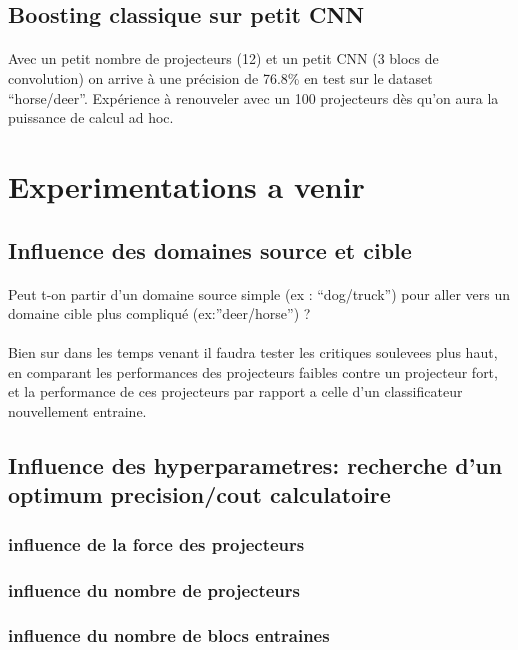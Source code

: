 \documentclass[11 pt]{article}
\begin{document}
\subsection{Boosting classique sur petit CNN}
\paragraph{}Avec un petit nombre de projecteurs (12) et un petit CNN (3 blocs de convolution) on arrive à une précision de 76.8\% en test sur le dataset “horse/deer”. Expérience à renouveler avec un 100 projecteurs dès qu’on aura la puissance de calcul ad hoc.

\section{Experimentations a venir}
\subsection{Influence des domaines source et cible}
\paragraph{}Peut t-on partir d’un domaine source simple (ex : “dog/truck”) pour aller vers un domaine cible plus compliqué (ex:”deer/horse”) ?

\paragraph{}Bien sur dans les temps venant il faudra tester les critiques soulevees plus haut, en comparant les performances des projecteurs faibles contre un projecteur fort, et la performance de ces projecteurs par rapport a celle d'un classificateur nouvellement entraine.


\subsection{Influence des hyperparametres: recherche d'un optimum precision/cout calculatoire}
\subsubsection{influence de la force des projecteurs}
\subsubsection{influence du nombre de projecteurs}
\subsubsection{influence du nombre de blocs entraines}
\end{document}
